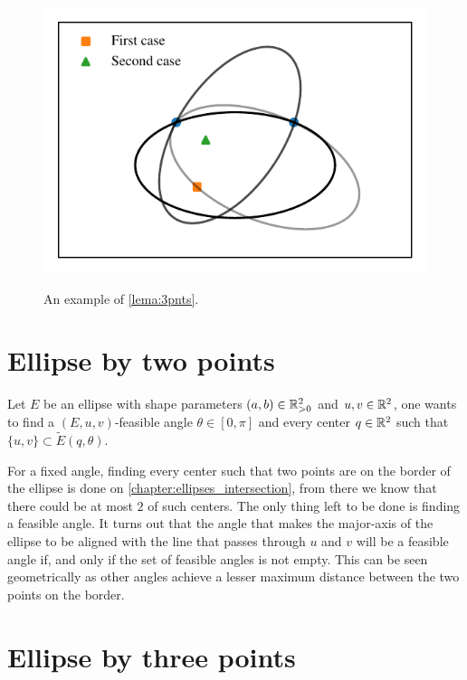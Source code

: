 \begin{figure}[H]
	\centering
	\caption{An example of \autoref{lema:3pnts}.}
	\includegraphics[scale=.8]{tex/figures/scripts/lema-3-points}
	\fautor
	\label{fig:lema-3-points}
\end{figure}


\section{Ellipse by two points}

Let $E$ be an ellipse with shape parameters $(a, b)\in \mathbb{R}^2_{>0}$ and $u, v\in \mathbb{R}^2$, one wants to find a $(E, u, v)$-feasible angle $\theta\in[0,\pi]$ and every center $q\in\mathbb{R}^2$ such that $\{u, v\} \subset \tilde{E}(q, \theta)$.

For a fixed angle, finding every center such that two points are on the border of the ellipse is done on \autoref{chapter:ellipses_intersection}, from there we know that there could be at most $2$ of such centers. The only thing left to be done is finding a feasible angle. It turns out that the angle that makes the major-axis of the ellipse to be aligned with the line that passes through $u$ and $v$ will be a feasible angle if, and only if the set of feasible angles is not empty. This can be seen geometrically as other angles achieve a lesser maximum distance between the two points on the border.

\section{Ellipse by three points}


